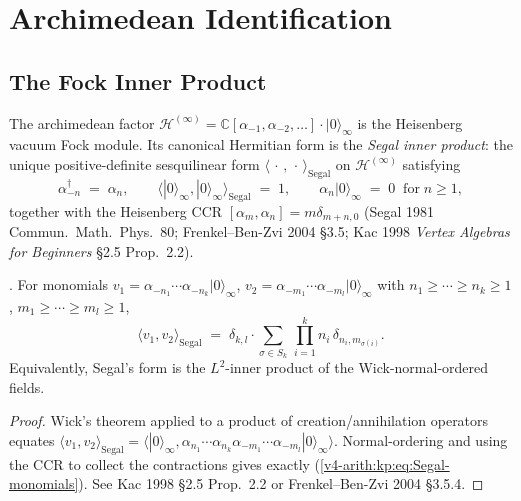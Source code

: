 \section{Archimedean Identification}
\label{v4-arith:kp:arch}

\subsection{The Fock Inner Product}
\label{v4-arith:kp:arch:Fock}

The archimedean factor
\(\mathcal{H}^{(\infty)}=\mathbb{C}[\alpha_{-1},\alpha_{-2},\ldots]\cdot|0\rangle_{\infty}\)
is the Heisenberg vacuum Fock module. Its canonical Hermitian
form is the \emph{Segal inner product}: the unique
positive-definite sesquilinear form \(\langle\,\cdot\,,\,\cdot\,\rangle_{\mathrm{Segal}}\)
on \(\mathcal{H}^{(\infty)}\) satisfying
\begin{equation}
\label{v4-arith:kp:eq:Segal-normalisation}
\alpha_{-n}^{\dagger}\;=\;\alpha_{n},
\qquad
\langle |0\rangle_{\infty},|0\rangle_{\infty}\rangle_{\mathrm{Segal}}\;=\;1,
\qquad
\alpha_{n}|0\rangle_{\infty}\;=\;0\;\;\text{for}\;n\geq 1,
\end{equation}
together with the Heisenberg CCR
\([\alpha_{m},\alpha_{n}]=m\delta_{m+n,0}\) (Segal 1981
Commun.~Math.~Phys.~80; Frenkel--Ben-Zvi 2004 \S3.5; Kac 1998
\emph{Vertex Algebras for Beginners} \S2.5 Prop.~2.2).

\begin{proposition}
\label{v4-arith:kp:prop:Segal-monomials}
\ClaimStatusProvedElsewhere. For monomials
\(v_{1}=\alpha_{-n_{1}}\cdots\alpha_{-n_{k}}|0\rangle_{\infty}\),
\(v_{2}=\alpha_{-m_{1}}\cdots\alpha_{-m_{l}}|0\rangle_{\infty}\)
with \(n_{1}\geq\cdots\geq n_{k}\geq 1\),
\(m_{1}\geq\cdots\geq m_{l}\geq 1\),
\begin{equation}
\label{v4-arith:kp:eq:Segal-monomials}
\langle v_{1},v_{2}\rangle_{\mathrm{Segal}}
\;=\;
\delta_{k,l}\cdot\sum_{\sigma\in S_{k}}\,
\prod_{i=1}^{k}n_{i}\,\delta_{n_{i},m_{\sigma(i)}}.
\end{equation}
Equivalently, Segal's form is the \(L^{2}\)-inner product of the
Wick-normal-ordered fields.
\end{proposition}

\begin{proof}
Wick's theorem applied to a product of creation/annihilation
operators equates
\(\langle v_{1},v_{2}\rangle_{\mathrm{Segal}}
=\langle|0\rangle_{\infty},\alpha_{n_{1}}\cdots\alpha_{n_{k}}
\alpha_{-m_{1}}\cdots\alpha_{-m_{l}}|0\rangle_{\infty}\rangle\).
Normal-ordering and using the CCR to collect the contractions
gives exactly
(\ref{v4-arith:kp:eq:Segal-monomials}). See Kac 1998 \S2.5
Prop.~2.2 or Frenkel--Ben-Zvi 2004 \S3.5.4.
\end{proof}

